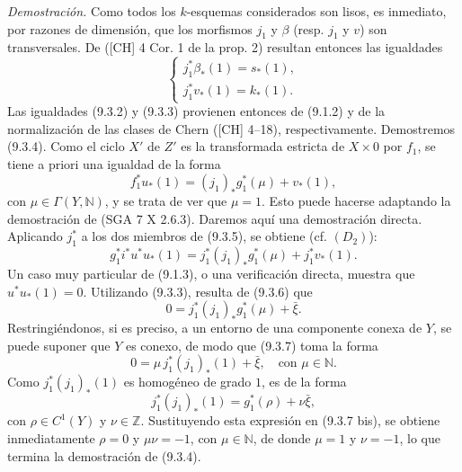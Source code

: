 \emph{Demostración.} Como todos los $k$-esquemas considerados son lisos, es inmediato, por razones de dimensión, que los morfismos $j_1$ y $\beta$ (resp. $j_1$ y $v$) son transversales. De ([CH] 4 Cor. 1 de la prop. 2) resultan entonces las igualdades
\[
\begin{cases}
j_1^*\beta_*(1)=s_*(1),\\
j_1^*v_*(1)=k_*(1).
\end{cases}
\]
Las igualdades (9.3.2) y (9.3.3) provienen entonces de (9.1.2) y de la normalización de las clases de Chern ([CH] 4--18), respectivamente. Demostremos (9.3.4). Como el ciclo $X'$ de $Z'$ es la transformada estricta de $X\times0$ por $f_1$, se tiene a priori una igualdad de la forma
\[
f_1^*u_*(1)=(j_1)_*g_1^*(\mu)+v_*(1),
\tag{9.3.5}
\]
con $\mu\in\Gamma(Y,\mathbb N)$, y se trata de ver que $\mu=1$. Esto puede hacerse adaptando la demostración de (SGA 7 X 2.6.3). Daremos aquí una demostración directa. Aplicando $j_1^*$ a los dos miembros de (9.3.5), se obtiene (cf. $(D_2)$):
\[
g_1^*i^*u^*u_*(1)=j_1^*(j_1)_*g_1^*(\mu)+j_1^*v_*(1).
\tag{9.3.6}
\]
Un caso muy particular de (9.1.3), o una verificación directa, muestra que $u^*u_*(1)=0$. Utilizando (9.3.3), resulta de (9.3.6) que
\[
0=j_1^*(j_1)_*g_1^*(\mu)+\bar\xi.
\tag{9.3.7}
\]
Restringiéndonos, si es preciso, a un entorno de una componente conexa de $Y$, se puede suponer que $Y$ es conexo, de modo que (9.3.7) toma la forma
\[
0=\mu\,j_1^*(j_1)_*(1)+\bar\xi,\quad\text{con }\mu\in\mathbb N.
\tag{9.3.7 bis}
\]
Como $j_1^*(j_1)_*(1)$ es homogéneo de grado $1$, es de la forma
\[
j_1^*(j_1)_*(1)=g_1^*(\rho)+\nu\bar\xi,
\]
con $\rho\in C^1(Y)$ y $\nu\in\mathbb Z$. Sustituyendo esta expresión en (9.3.7 bis), se obtiene inmediatamente $\rho=0$ y $\mu\nu=-1$, con $\mu\in\mathbb N$, de donde $\mu=1$ y $\nu=-1$, lo que termina la demostración de (9.3.4).
